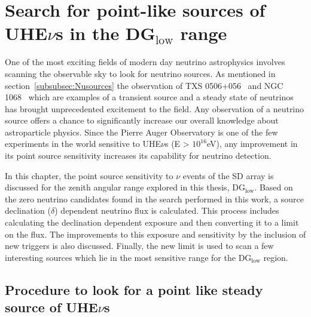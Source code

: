 
\chapter{Search for point-like sources of UHE\texorpdfstring{$\nu$}{}s in the DG\texorpdfstring{$_{\text{low}}$}{} range}
\label{chap:follow-up}

One of the most exciting fields of modern day neutrino astrophysics involves scanning the observable sky to look for neutrino sources. As mentioned in section~\ref{subsubsec:Nusources} the observation of TXS 0506+056~\cite{Icecube_txs} and NGC 1068~\cite{Icecube_2022} which are examples of a transient source and a steady state of neutrinos has brought unprecedented excitement to the field. Any observation of a neutrino source offers a chance to significantly increase our overall knowledge about astroparticle physics. Since the Pierre Auger Observatory is one of the few experiments in the world sensitive to UHE$\nu$s (E > $10^{16}$eV), any improvement in its point source sensitivity increases its capability for neutrino detection. 

In this chapter, the point source sensitivity to $\nu$ events of the SD array is discussed for the zenith angular range explored in this thesis, DG$_{\text{low}}$. Based on the zero neutrino candidates found in the search performed in this work, a source declination ($\delta$) dependent neutrino flux is calculated. This process includes calculating the declination dependent exposure and then converting it to a limit on the flux. The improvements to this exposure and sensitivity by the inclusion of new triggers is also discussed. Finally, the new limit is used to scan a few interesting sources which lie in the most sensitive range for the DG$_{\text{low}}$ region.

\section{Procedure to look for a point like steady source of UHE\texorpdfstring{$\nu$}{}s}
\label{sec:procedure_point_source}

